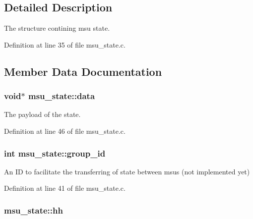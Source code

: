\subsection{Detailed Description}
The structure contining msu state. 

Definition at line 35 of file msu\-\_\-state.\-c.



\subsection{Member Data Documentation}
\hypertarget{structmsu__state_a7c6d1548878fbcafa7f359f05303b8b3}{
\subsubsection[{data}]{\setlength{\rightskip}{0pt plus 5cm}void$\ast$ msu\-\_\-state\-::data}}\label{structmsu__state_a7c6d1548878fbcafa7f359f05303b8b3}


The payload of the state. 



Definition at line 46 of file msu\-\_\-state.\-c.

\hypertarget{structmsu__state_aced19bc311412983eef344487d088895}{
\subsubsection[{group\-\_\-id}]{\setlength{\rightskip}{0pt plus 5cm}int msu\-\_\-state\-::group\-\_\-id}}\label{structmsu__state_aced19bc311412983eef344487d088895}


An I\-D to facilitate the transferring of state between msus (not implemented yet) 



Definition at line 41 of file msu\-\_\-state.\-c.

\hypertarget{structmsu__state_a07301d57260c6fb15ee1c2f8abab45dd}{
\subsubsection[{hh}]{ msu\-\_\-state\-::hh}}\label{structmsu__state_a07301d57260c6fb15ee1c2f8abab45dd}


